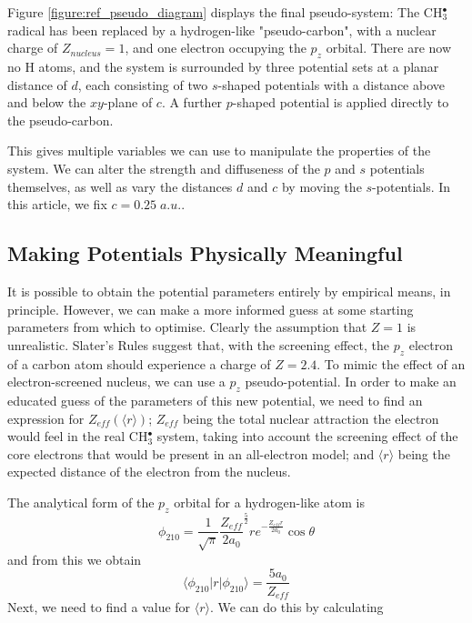 \documentclass[12pt]{article}
\begin{document}
Figure \ref{figure:ref_pseudo_diagram} displays the final pseudo-system: The CH\(^{\bullet}_{3}\) radical has been replaced by
a hydrogen-like "pseudo-carbon", with a nuclear charge of \(Z_{nucleus} = 1\), and one electron occupying the \(p_{z}\) orbital. 
There are now no H atoms, and the system is surrounded by three potential sets at a planar distance of \(d\), each consisting of 
two \(s\)-shaped potentials with a distance above and below the \(xy\)-plane of \(c\). A further \(p\)-shaped potential is applied
directly to the pseudo-carbon.

This gives multiple variables we can use to manipulate the properties of the system.
We can alter the strength and diffuseness of the \(p\) and \(s\) potentials themselves,
as well as vary the distances \(d\) and \(c\) by moving the \(s\)-potentials.
In this article, we fix \(c = 0.25\;a.u.\).

\subsection*{\sffamily \large Making Potentials Physically Meaningful}
\label{section:potential_derivation}

It is possible to obtain the potential parameters entirely by empirical means, in principle. However, we can make a more informed guess at some starting parameters from which to optimise. Clearly the assumption that \(Z = 1\) is unrealistic. Slater's Rules\cite{slatersrules} suggest that, with the screening effect, the \(p_{z}\) electron of a carbon atom should experience a charge of \(Z = 2.4\). To mimic the effect of an electron-screened nucleus, we can use a \(p_{z}\) pseudo-potential. In order to make an educated guess of the parameters of this new potential, we need to find an expression for \(Z_{eff}(\langle r \rangle)\); \(Z_{eff}\) being the total nuclear attraction the electron would feel in the real CH\(^{\bullet}_{3}\) system, taking into account the screening effect of the core electrons that would be present in an all-electron model; and \( \langle r \rangle \) being the expected distance of the electron from the nucleus.

The analytical form of the \(p_{z}\) orbital for a hydrogen-like atom is\cite{nyu_h_solutions}
\begin{equation}
\phi_{210} = \frac{1}{\sqrt{\pi}} \frac{Z_{eff}}{2a_{0}} ^{\frac{5}{2}} re^{-\frac{Z_{eff}r}{2a_{0}}} \cos \theta
\end{equation}
and from this we obtain 
\begin{equation}
\label{equation:PsirPsi}
\langle \phi_{210} | r | \phi_{210} \rangle = \frac{5a_{0}}{Z_{eff}}
\end{equation}
Next, we need to find a value for \( \langle r \rangle \). We can do this by calculating
\end{document}
